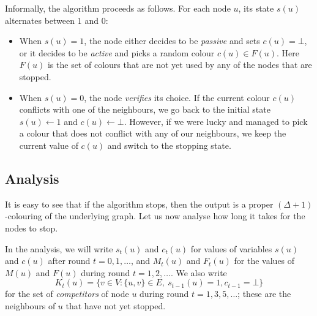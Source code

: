 Informally, the algorithm proceeds as follows. For each node $u$, its state $s(u)$ alternates between $1$ and $0$:
\begin{itemize}
    \item When $s(u) = 1$, the node either decides to be \emph{passive} and sets $c(u) = \bot$, or it decides to be \emph{active} and picks a random colour $c(u) \in F(u)$. Here $F(u)$ is the set of colours that are not yet used by any of the nodes that are stopped.
    \item When $s(u) = 0$, the node \emph{verifies} its choice. If the current colour $c(u)$ conflicts with one of the neighbours, we go back to the initial state $s(u) \gets 1$ and $c(u) \gets \bot$. However, if we were lucky and managed to pick a colour that does not conflict with any of our neighbours, we keep the current value of $c(u)$ and switch to the stopping state.
\end{itemize}


\subsection{Analysis}

It is easy to see that if the algorithm stops, then the output is a proper ${(\Delta+1)}$-colouring of the underlying graph. Let us now analyse how long it takes for the nodes to stop.

In the analysis, we will write $s_t(u)$ and $c_t(u)$ for values of variables $s(u)$ and $c(u)$ after round $t = 0,1,\dotsc$, and $M_t(u)$ and $F_t(u)$ for the values of $M(u)$ and $F(u)$ during round $t=1,2,\dotsc$. We also write
\[
    K_t(u) = \bigl\{ v \in V : \{u,v\} \in E,\ s_{t-1}(u) = 1, c_{t-1} = \bot \bigr\}
\]
for the set of \emph{competitors} of node $u$ during round $t = 1,3,5,\dotsc$; these are the neighbours of $u$ that have not yet stopped.

